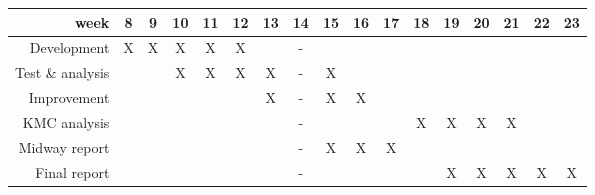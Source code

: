 \documentclass[12pt]{article}
\begin{document}
\begin{tabular}{|r|cccccccccccccccc|}
\hline
\textbf{week} & 8 & 9 & 10 & 11 & 12 & 13 & 14 & 15 & 16 & 17 & 18 & 19 & 20 & 21 & 22 & 23 \\
\hline
Development & X & X & X & X & X & & - &&&&&&&&& \\
Test \& analysis & & & X & X & X & X & - & X &&&&&&&& \\
Improvement &&&&&& X & - & X & X &&&&&&& \\
KMC analysis &&&&&&& - &&&& X & X & X & X && \\
Midway report &&&&&&& - & X & X & X &&&&&& \\
Final report &&&&&&& - &&&&& X & X & X & X & X \\
\hline
\end{tabular}

	
	

	
\newpage



\end{document}
